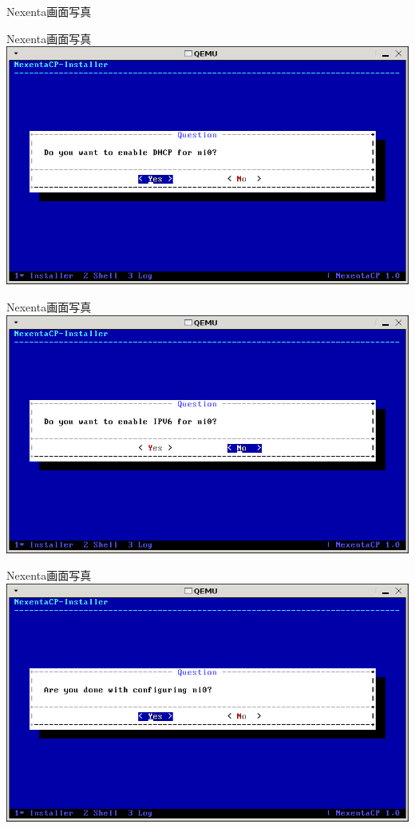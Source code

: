 \documentclass[cjk,dvipdfmx,12pt]{beamer}
\begin{document}
\begin{frame}{Nexenta画面写真}
\end{frame}\begin{frame}{Nexenta画面写真} 
\includegraphics[width=1.0\hsize]{image200804/nexenta19.png}
\end{frame}\begin{frame}{Nexenta画面写真} 
\includegraphics[width=1.0\hsize]{image200804/nexenta20.png}
\end{frame}\begin{frame}{Nexenta画面写真} 
\includegraphics[width=1.0\hsize]{image200804/nexenta21.png}

\end{frame}
\end{document}
